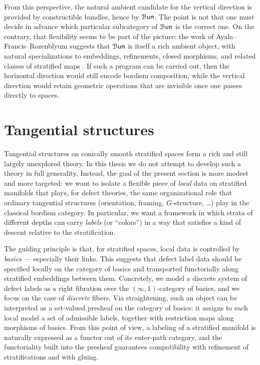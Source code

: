 \begin{remark}
    From this perspective, the natural ambient candidate for the vertical direction is provided by constructible bundles, hence by $\operatorname{\mathcal B\mathsf{un}}$. The point is not that one must decide in advance which particular subcategory of $\operatorname{\mathcal B\mathsf{un}}$ is the correct one. On the contrary, that flexibility seems to be part of the picture: the work of Ayala--Francis--Rozenblyum suggests that $\operatorname{\mathcal B\mathsf{un}}$ is itself a rich ambient object, with natural specializations to embeddings, refinements, closed morphisms, and related classes of stratified maps \cite{AFR1,AFR2}. If such a program can be carried out, then the horizontal direction would still encode bordism composition, while the vertical direction would retain geometric operations that are invisible once one passes directly to spaces.
\end{remark}

\section{Tangential structures}


Tangential structures on conically smooth stratified spaces form a rich and still largely unexplored theory. In this thesis we do not attempt to develop such a theory in full generality. Instead, the goal of the present section is more modest and more targeted: we want to isolate a flexible piece of \emph{local} data on stratified manifolds that plays, for defect theories, the same organizational role that ordinary tangential structures (orientation, framing, $G$-structure, \dots) play in the classical bordism category. In particular, we want a framework in which strata of different depths can carry \emph{labels} (or ``colors'') in a way that satisfies a kind of descent relative to the stratification. 

The guiding principle is that, for stratified spaces, local data is controlled by \emph{basics} — especially their links. This suggests that defect label data should be specified locally on the category of basics and
transported functorially along stratified embeddings between them. Concretely, we model a discrete
system of defect labels as a right fibration over the $(\infty,1)$-category of basics, and we focus on
the case of \emph{discrete} fibers. Via straightening, such an object can be interpreted as a
set-valued presheaf on the category of basics: it assigns to each local model a set of admissible
labels, together with restriction maps along morphisms of basics. From this point of view, a labeling of
a stratified manifold is naturally expressed as a functor out of its enter-path category, and the
functoriality built into the presheaf guarantees compatibility with refinement of stratifications and with gluing.

